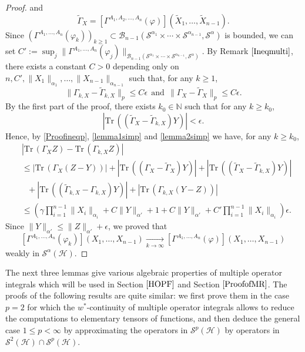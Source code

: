 \documentclass[12pt]{amsart}
\theoremstyle{remark}
\def\tr{{\mathrm{Tr}\,}}
\begin{document}
\begin{proof}
and
$$\tilde{\Gamma}_X = \left[\Gamma^{A_1,A_2, \ldots, A_n}(\varphi)\right](\tilde{X}_1, \ldots, \tilde{X}_{n-1}).
$$
Since $\left(\Gamma^{A_1, \ldots, A_n}(\varphi_k) \right)_{k\geq 1} \subset \mathcal{B}_{n-1}(\mathcal{S}^{\alpha_1} \times \cdots \times \mathcal{S}^{\alpha_{n-1}}, \mathcal{S}^{\alpha})$ is bounded, we can set $C' := \sup_j \|\Gamma^{A_1, \ldots, A_n}(\varphi_j)\|_{\mathcal{B}_{n-1}(\mathcal{S}^{\alpha_1} \times \cdots \times \mathcal{S}^{\alpha_{n-1}}, \mathcal{S}^{\alpha})}$. By Remark $\ref{Ineqmulti}$, there exists a constant $C > 0$ depending only on $n, C', \|X_1\|_{\alpha_1}, \ldots, \|X_{n-1}\|_{\alpha_{n-1}}$ such that, for any $k\geq 1$,
\begin{equation}\label{lemma1simp}
\| \Gamma_{k,X} - \tilde{\Gamma}_{k,X} \|_p \leq C \epsilon \ \ \text{and} \ \ \| \Gamma_{X} - \tilde{\Gamma}_{X} \|_p \leq C \epsilon.
\end{equation}
By the first part of the proof, there exists $k_0 \in \mathbb{N}$ such that for any $k\geq k_0$,
\begin{equation}\label{lemma2simp}
| \tr((\tilde{\Gamma}_X - \tilde{\Gamma}_{k,X})Y)| < \epsilon.
\end{equation}
Hence, by \eqref{Proofineqp}, \eqref{lemma1simp} and \eqref{lemma2simp} we have, for any $k\geq k_0$,
\begin{align*}
& | \tr(\Gamma_{X}Z) - \tr(\Gamma_{k,X}Z) | \\
& \leq | \tr(\Gamma_{X}(Z-Y)) | + | \tr((\Gamma_{X} - \tilde{\Gamma}_{X})Y) | + | \tr((\tilde{\Gamma}_{X} - \tilde{\Gamma}_{k,X})Y) | \\
& \ \ \ + | \tr((\tilde{\Gamma}_{k,X} - \Gamma_{k,X})Y) | + | \tr(\Gamma_{k,X}(Y-Z)) | \\
& \leq \left(\gamma \prod_{i=1}^{n-1} \|X_i\|_{\alpha_i} + C \|Y\|_{\alpha'} + 1 + C \|Y\|_{\alpha'} + C'\prod_{i=1}^{n-1} \|X_i\|_{\alpha_i} \right) \epsilon.
\end{align*}
Since $\|Y\|_{\alpha'} \leq \|Z\|_{\alpha'} + \epsilon$, we proved that $$
\left[ \Gamma^{A_1, \ldots, A_n}(\varphi_k) \right](X_1, \ldots, X_{n-1}) \underset{k \to \infty}{\longrightarrow} \left[ \Gamma^{A_1, \ldots, A_n}(\varphi) \right](X_1, \ldots, X_{n-1})
$$
weakly in $\mathcal{S}^{\alpha}(\mathcal{H})$.

\end{proof}



The next three lemmas give various algebraic properties of multiple operator integrals which will be used in Section $\ref{HOPF}$ and Section $\ref{ProofofMR}$. The proofs of the following results are quite similar: we first prove them in the case $p=2$ for which the $w^*$-continuity of multiple operator integrals allows to reduce the computations to elementary tensors of functions, and then deduce the general case $1 \leq p <\infty$ by approximating the operators in $\mathcal{S}^p(\mathcal{H})$ by operators in $\mathcal{S}^2(\mathcal{H}) \cap \mathcal{S}^p(\mathcal{H})$.
\end{document}
